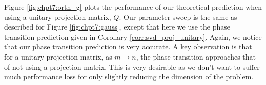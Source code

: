 Figure \ref{fig:chpt7:orth_g} plots the performance of our theoretical prediction when
using a unitary projection matrix, $Q$. Our parameter sweep is the same as described for
Figure \ref{fig:chpt7:gauss}, except that here we use the phase transition prediction
given in Corollary \ref{corr:svd_proj_unitary}. Again, we notice that our phase transition
prediction is very accurate. A key observation is that for a unitary projection matrix, as
$m\to n$, the phase transition approaches that of not using a projection matrix. This is
very desirable as we don't want to suffer much performance loss for only slightly reducing
the dimension of the problem.

\begin{figure}
\begin{center}
\end{center}
\end{figure}

